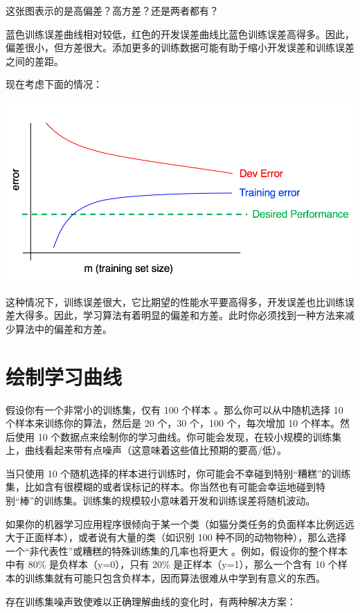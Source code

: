 这张图表示的是高偏差？高方差？还是两者都有？

蓝色训练误差曲线相对较低，红色的开发误差曲线比蓝色训练误差高得多。因此，偏差很小，但方差很大。添加更多的训练数据可能有助于缩小开发误差和训练误差之间的差距。

现在考虑下面的情况：

\includegraphics{./img/ch31_02.jpg}

这种情况下，训练误差很大，它比期望的性能水平要高得多，开发误差也比训练误差大得多。因此，学习算法有着明显的偏差和方差。此时你必须找到一种方法来减少算法中的偏差和方差。

\hypertarget{ux7ed8ux5236ux5b66ux4e60ux66f2ux7ebf}{%
\chapter{绘制学习曲线}\label{ux7ed8ux5236ux5b66ux4e60ux66f2ux7ebf}}

假设你有一个非常小的训练集，仅有 100 个样本 。那么你可以从中随机选择 10
个样本来训练你的算法，然后是 20 个，30 个，100 个，每次增加 10
个样本。然后使用 10
个数据点来绘制你的学习曲线。你可能会发现，在较小规模的训练集上，曲线看起来带有点噪声（这意味着这些值比预期的要高/低）。

当只使用 10
个随机选择的样本进行训练时，你可能会不幸碰到特别``糟糕''的训练集，比如含有很模糊的或者误标记的样本。你当然也有可能会幸运地碰到特别``棒''的训练集。训练集的规模较小意味着开发和训练误差将随机波动。

如果你的机器学习应用程序很倾向于某一个类（如猫分类任务的负面样本比例远远大于正面样本），或者说有大量的类（如识别
100
种不同的动物物种），那么选择一个``非代表性''或糟糕的特殊训练集的几率也将更大
。例如，假设你的整个样本中有 80\% 是负样本（y=0），只有 20\%
是正样本（y=1），那么一个含有 10
个样本的训练集就有可能只包含负样本，因而算法很难从中学到有意义的东西。

存在训练集噪声致使难以正确理解曲线的变化时，有两种解决方案：

